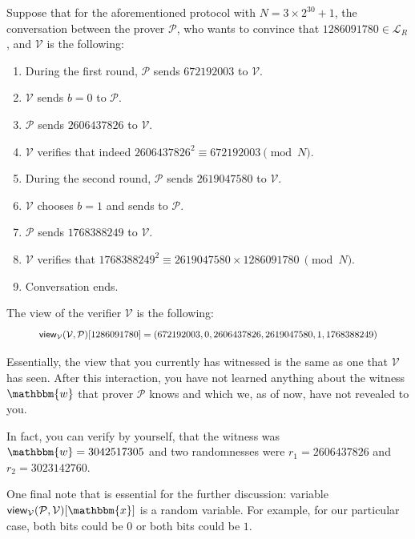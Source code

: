 \documentclass[../../book.tex]{subfiles}
\begin{document}
\begin{example}
    Suppose that for the aforementioned protocol with $N=3 \times 2^{30} + 1$,
    the conversation between the prover $\mathcal{P}$, who wants to convince
    that $1286091780 \in \mathcal{L}_R$, and $\mathcal{V}$ is the following:
    \begin{enumerate} %
        \item During the first round, $\mathcal{P}$ sends $672192003$ to $\mathcal{V}$.
        \item $\mathcal{V}$ sends $b=0$ to $\mathcal{P}$.
        \item $\mathcal{P}$ sends $2606437826$ to $\mathcal{V}$.
        \item $\mathcal{V}$ verifies that indeed $2606437826^2 \equiv 672192003 \pmod{N}$.
        \item During the second round, $\mathcal{P}$ sends $2619047580$ to $\mathcal{V}$.
        \item $\mathcal{V}$ chooses $b=1$ and sends to $\mathcal{P}$.
        \item $\mathcal{P}$ sends $1768388249$ to $\mathcal{V}$.
        \item $\mathcal{V}$ verifies that $1768388249^2 \equiv 2619047580 \times 1286091780~\pmod{N}$.
        \item Conversation ends.
    \end{enumerate}

    The view of the verifier $\mathcal{V}$ is the following: 
    \begin{equation*}
        \scalebox{0.85}{
            $\mathsf{view}_{\mathcal{V}}(\mathcal{V}, \mathcal{P})[1286091780] = (672192003, 0, 2606437826, 2619047580, 1, 1768388249)$
        }
    \end{equation*}

    Essentially, the view that you currently has witnessed is the same as one
    that $\mathcal{V}$ has seen. After this interaction, you have not learned
    anything about the witness $\mathbbm{w}$ that prover $\mathcal{P}$ knows and
    which we, as of now, have not revealed to you.

    In fact, you can verify by yourself, that the witness was $\mathbbm{w} =
    3042517305$ and two randomnesses were $r_1 = 2606437826$ and $r_2 =
    3023142760$.

    One final note that is essential for the further discussion: variable
    $\mathsf{view}_{\mathcal{V}}(\mathcal{P}, \mathcal{V})[\mathbbm{x}]$ is a
    random variable. For example, for our particular case, both bits could be
    $0$ or both bits could be $1$. 
\end{example}
\end{document}
